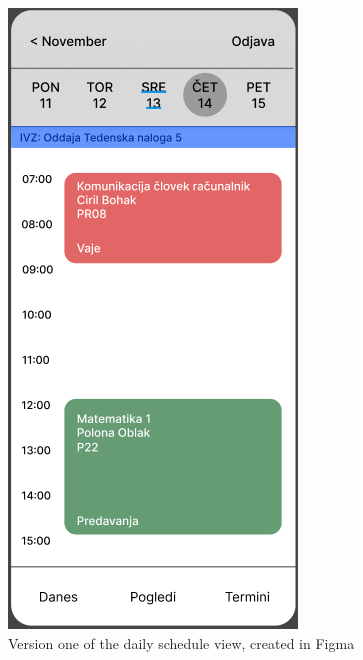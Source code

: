 \documentclass[sigconf,nonacm]{acmart}
\begin{document}
\begin{figure}[h]
  \centering
  \includegraphics[width=\linewidth]{dnevni-pogled.png}
  \caption{Version one of the daily schedule view, created in Figma}
\end{figure}
\end{document}
